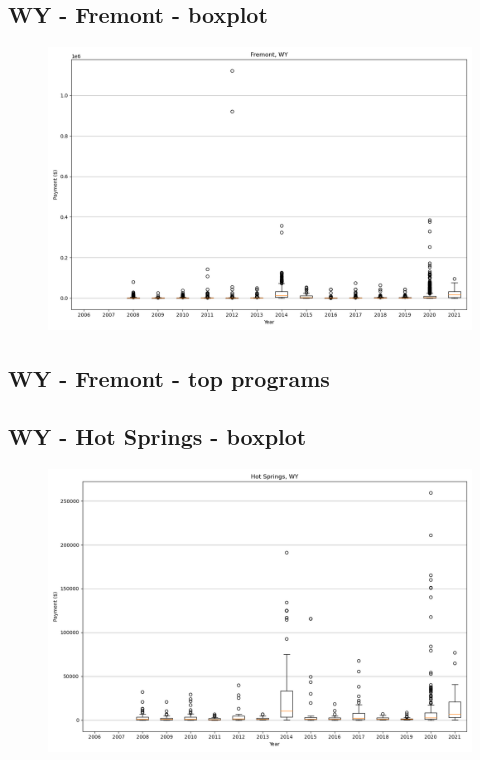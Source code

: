 \subsection*{WY - Fremont - boxplot}
\begin{figure}[h]
\centering
\includegraphics[width=7in]{../output/boxplots/counties/Fremont-WY_boxplot.png}
\end{figure}


\subsection*{WY - Fremont - top programs}

\newpage
\subsection*{WY - Hot Springs - boxplot}
\begin{figure}[h]
\centering
\includegraphics[width=7in]{../output/boxplots/counties/Hot Springs-WY_boxplot.png}
\end{figure}


